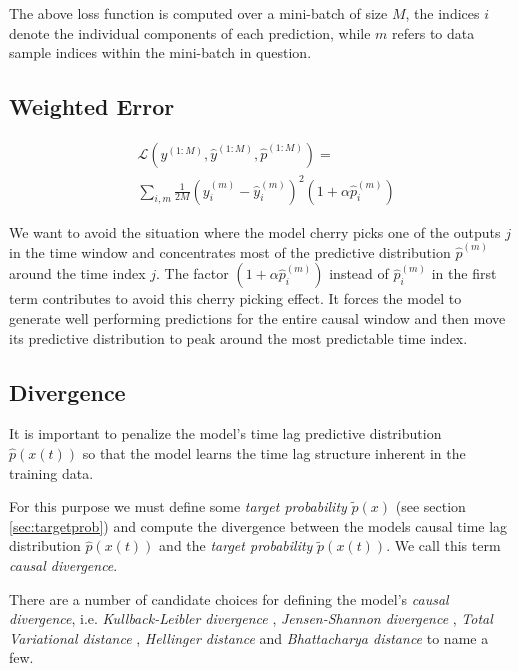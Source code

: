 \documentclass[envcountsect,runningheads]{llncs}
\theoremstyle{etoile}
\begin{document}
The above loss function is computed over a mini-batch of size $M$, the indices $i$ denote the
individual components of each prediction, while $m$ refers to data sample indices within the
mini-batch in question.

\subsection{Weighted Error}


\begin{align}\label{eq:errorfunc}
&\mathcal{L}(y^{(1:M)}, \hat{y}^{(1:M)}, \hat{p}^{(1:M)}) =\\ 
& \sum_{i,m}{\frac{1}{2M} (y^{(m)}_{i} - \hat{y}^{(m)}_{i})^2 (1 + \alpha \hat{p}^{(m)}_i)}
\end{align}

We want to avoid the situation where the model cherry picks one of the outputs 
$j$ in the time window and concentrates most of the predictive 
distribution $\hat p^{(m)}$ around the time index $j$. The factor 
$(1 + \alpha \hat p_i^{(m)})$ instead of $\hat p_i^{(m)}$ in the first term 
contributes to avoid this cherry picking effect. It forces the model to 
generate well performing predictions for the entire causal window and then 
move its predictive distribution to peak around the most predictable time index.

\subsection{Divergence}

It is important to penalize the model's time lag predictive distribution 
$\hat{p}(x(t))$ so that the model learns the time lag structure inherent in the 
training data.

For this purpose we must define some \emph{target probability} $\tilde{p}(x)$ 
(see section \ref{sec:targetprob}) and compute the divergence between the models causal 
time lag distribution $\hat{p}(x(t))$ and the \emph{target probability} $\tilde{p}(x(t))$. 
We call this term \emph{causal divergence}.

There are a number of candidate choices for defining the model's \emph{causal divergence}, 
i.e.  \emph{Kullback-Leibler divergence} \cite{kullback1951}, 
\emph{Jensen-Shannon divergence} \cite{jensen-shannon}, \emph{Total Variational distance} 
\cite{villani2009three}, \emph{Hellinger distance} \cite{hellinger} and 
\emph{Bhattacharya distance} \cite{bhattacharyya} to name a few. 
\end{document}
